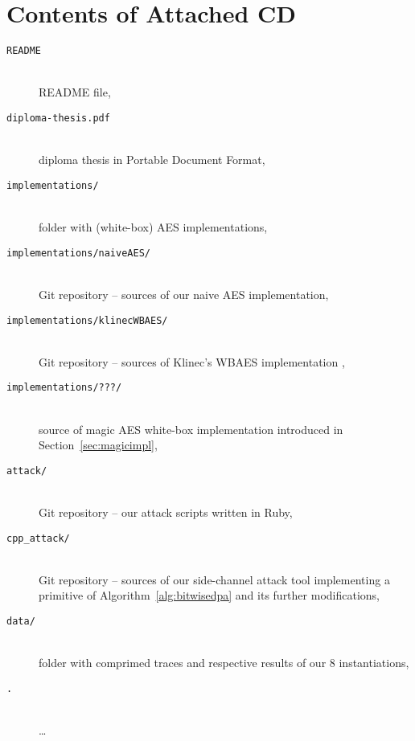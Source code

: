 \chapter{Contents of Attached CD}
\label{app:cd}
	
	\begin{description}
		\item[\tt README] ~ \\ README file,
		\item[\tt diploma-thesis.pdf] ~ \\ diploma thesis in Portable Document Format,
		\item[\tt implementations/] ~ \\ folder with (white-box) AES implementations,
		\item[\tt implementations/naiveAES/] ~ \\ Git repository -- sources of our naive AES implementation,
		\item[\tt implementations/klinecWBAES/] ~ \\ Git repository -- sources of Klinec's WBAES implementation \cite{klinec2013implementation},
		\item[\tt implementations/???/] ~ \\ source of magic AES white-box implementation introduced in Section~\ref{sec:magicimpl},
		\item[\tt attack/] ~ \\ Git repository -- our attack scripts written in Ruby,
		\item[\tt cpp\_attack/] ~ \\ Git repository -- sources of our side-channel attack tool implementing a primitive of Algorithm~\ref{alg:bitwisedpa} and its further modifications,
		\item[\tt data/] ~ \\ folder with comprimed traces and respective results of our $8$ instantiations,
		\item[\tt .] ~ \\ \ldots
	\end{description}
